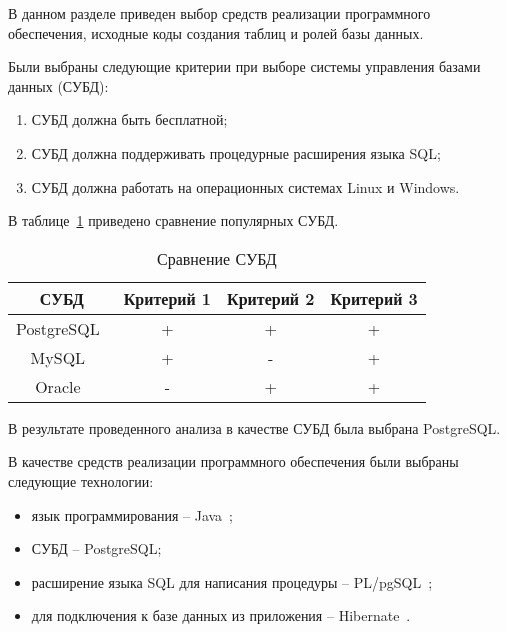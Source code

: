 \label{cha:T}
В данном разделе приведен выбор средств реализации программного обеспечения, исходные коды создания таблиц и ролей базы данных.

Были выбраны следующие критерии при выборе системы управления базами данных (СУБД):
\begin{enumerate}
	\item СУБД должна быть бесплатной;
	\item СУБД должна поддерживать процедурные расширения языка SQL;
	\item СУБД должна работать на операционных системах Linux и Windows.
\end{enumerate}

В таблице~\ref{tab:subd} приведено сравнение популярных СУБД.
\begin{table}[H]
	\begin{center}
		\begin{center}
			\caption{\label{tab:subd}Сравнение СУБД}
		\end{center}
		\begin{tabular}{|c|c|c|c|}
			\hline 
			СУБД & Критерий \textnumero{} 1 & Критерий \textnumero{} 2 &  Критерий \textnumero{} 3 \\ \hline
			PostgreSQL~\cite{postgres} &  + & + & + \\ \hline
			MySQL~\cite{mysql} &  + &  - & + \\ \hline
			Oracle~\cite{oracle} &   -  &   + & +  \\ \hline
		\end{tabular}
	\end{center}
\end{table}

В результате проведенного анализа в качестве СУБД была выбрана  PostgreSQL.

В качестве средств реализации программного обеспечения были выбраны следующие технологии:
\begin{itemize}
	\item язык программирования -- Java~\cite{java};
	\item СУБД -- PostgreSQL;
	\item расширение языка SQL для написания процедуры -- PL/pgSQL~\cite{plpgsql};
	\item для подключения к базе данных из приложения -- Hibernate~\cite{hibernate}.
\end{itemize}


